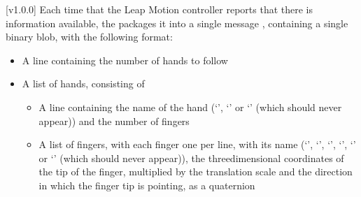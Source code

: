 [v1.0.0]
Each time that the Leap Motion controller reports that there is information available,
the  packages it into a single message
\openSq{}\closeSq, containing a single binary blob, with the following
format:
\begin{itemize}
\item A line containing the number of hands to follow
\item\exSp{}A list of hands, consisting of
\begin{itemize}
\item A line containing the name of the hand (`', `' or
`' (which should never appear)) and the number of fingers
\item\exSp{}A list of fingers, with each finger one per line, with its name
(`', `', `', `', `'
or `' (which should never appear)), the three\longDash{}dimensional
coordinates of the tip of the finger, multiplied by the translation scale and the
direction in which the finger tip is pointing, as a quaternion
\end{itemize}
\end{itemize}
\appendixEnd{}
